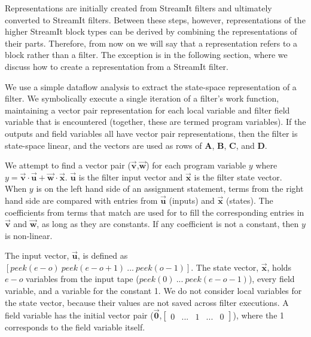    Representations are initially created from StreamIt filters and
ultimately converted to StreamIt filters. Between these steps,
however, representations of the higher StreamIt block types can be
derived by combining the representations of their parts.  Therefore,
from now on we will say that a representation refers to a block rather
than a filter. The exception is in the following section, where we
discuss how to create a representation from a StreamIt filter.


    We use a simple dataflow analysis to extract the state-space representation of
a filter. We symbolically execute a single iteration of a filter's
work function, maintaining a vector pair representation for each
local variable and filter field variable that is encountered
(together, these are termed program variables). If the outputs and
field variables all have vector pair representations, then the
filter is state-space linear, and the vectors are used as rows of
$\mathbf{A}$, $\mathbf{B}$, $\mathbf{C}$, and $\mathbf{D}$. 

    We attempt to find a vector pair
($\vec{\mathbf{v}}$,$\vec{\mathbf{w}}$) for each program variable
$y$ where $y = \vec{\mathbf{v}} \cdot \vec{\mathbf{u}} +
\vec{\mathbf{w}} \cdot \vec{\mathbf{x}}$. $\vec{\mathbf{u}}$ is
the filter input vector and $\vec{\mathbf{x}}$ is the filter state
vector. When $y$ is on the left hand side of an assignment
statement, terms from the right hand side are compared with
entries from $\vec{\mathbf{u}}$ (inputs) and $\vec{\mathbf{x}}$
(states). The coefficients from terms that match are used for to
fill the corresponding entries in $\vec{\mathbf{v}}$ and
$\vec{\mathbf{w}}$, as long as they are constants. If any
coefficient is not a constant, then $y$ is non-linear.

    The input vector, $\vec{\mathbf{u}}$, is defined as $[peek(e-o)
~peek(e-o+1) ~... ~peek(o-1)]$. The state vector,
$\vec{\mathbf{x}}$, holds $e-o$ variables from the input tape
($peek(0) ~... ~peek(e-o-1)$), every field variable, and a
variable for the constant 1. We do not consider local variables
for the state vector, because their values are not saved across
filter executions. 
A field variable has the initial vector
pair ($\vec{\mathbf{0}}$,$\left [
\begin{array} {ccccc} 0 & ... & 1 & ... & 0 \end{array} \right
]$), where the 1 corresponds to the field variable itself.


